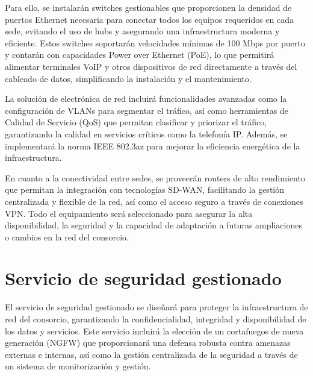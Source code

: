 \vspace{0.5cm}
Para ello, se instalarán switches gestionables que proporcionen la densidad de puertos Ethernet necesaria para conectar todos los equipos requeridos en cada sede, evitando el uso de hubs y asegurando una infraestructura moderna y eficiente. Estos switches soportarán velocidades mínimas de 100 Mbps por puerto y contarán con capacidades Power over Ethernet (PoE), lo que permitirá alimentar terminales VoIP y otros dispositivos de red directamente a través del cableado de datos, simplificando la instalación y el mantenimiento.

\vspace{0.5cm}
La solución de electrónica de red incluirá funcionalidades avanzadas como la configuración de VLANs para segmentar el tráfico, así como herramientas de Calidad de Servicio (QoS) que permitan clasificar y priorizar el tráfico, garantizando la calidad en servicios críticos como la telefonía IP. Además, se implementará la norma IEEE 802.3az para mejorar la eficiencia energética de la infraestructura.

\vspace{0.5cm}
En cuanto a la conectividad entre sedes, se proveerán routers de alto rendimiento que permitan la integración con tecnologías SD-WAN, facilitando la gestión centralizada y flexible de la red, así como el acceso seguro a través de conexiones VPN. Todo el equipamiento será seleccionado para asegurar la alta disponibilidad, la seguridad y la capacidad de adaptación a futuras ampliaciones o cambios en la red del consorcio.

\section{Servicio de seguridad gestionado}
\label{sec:servicios_seguridad_gestionado}
El servicio de seguridad gestionado se diseñará para proteger la infraestructura de red del consorcio, garantizando la confidencialidad, integridad y disponibilidad de los datos y servicios. Este servicio incluirá la elección de un cortafuegos de nueva generación (NGFW) que proporcionará una defensa robusta contra amenazas externas e internas, así como la gestión centralizada de la seguridad a través de un sistema de monitorización y gestión.

